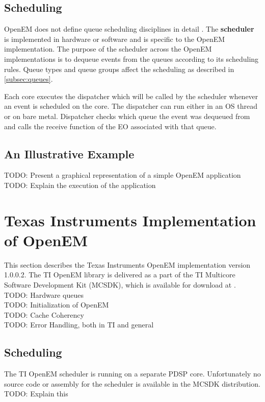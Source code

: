 \subsection{Scheduling}
\label{subsec:schedule}
OpenEM does not define queue scheduling disciplines in detail
\cite{openempage}. The \textbf{scheduler} is implemented in hardware or
software and is specific to the OpenEM implementation. The purpose of the
scheduler across the OpenEM implementations is to dequeue events from the
queues according to its scheduling rules. \cite{openemintro} Queue types and
queue groups affect the scheduling as described in \ref{subsec:queues}.

Each core executes the dispatcher which will be called by the scheduler
whenever an event is scheduled on the core. The dispatcher can run either in an
OS thread or on bare metal. Dispatcher checks which queue the event was
dequeued from and calls the receive function of the EO associated with that
queue. \cite{openemintro}

\subsection{An Illustrative Example}
\label{subsec:example}
TODO: Present a graphical representation of a simple OpenEM application\\
TODO: Explain the execution of the application

\section[Texas Instruments Implementation of OpenEM]{Texas Instruments Implementation \\ of OpenEM}
\label{sec:tiopenem}
This section describes the Texas Instruments OpenEM implementation version
1.0.0.2. The TI OpenEM library is delivered as a part of the TI Multicore
Software Development Kit (MCSDK), which is available for download at
\cite{mcsdkdown}.\\
TODO: Hardware queues\\
TODO: Initialization of OpenEM\\
TODO: Cache Coherency\\
TODO: Error Handling, both in TI and general

\subsection{Scheduling}
The TI OpenEM scheduler is running on a separate PDSP core. Unfortunately no
source code or assembly for the scheduler is available in the MCSDK distribution.\\
TODO: Explain this

